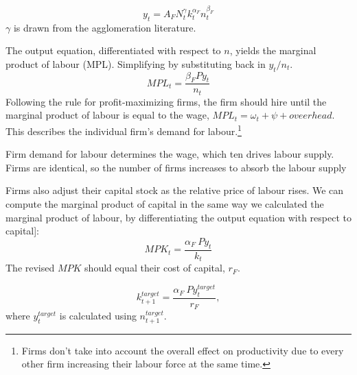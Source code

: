 \begin{equation}
    {y}_t= A_FN_t^\gamma k_t^{\alpha_F}n_t^{\beta_F} \label{eqn-urban-firm-output}
\end{equation}
$\gamma$ is drawn from the agglomeration literature.%

The output equation, differentiated with respect to  $n$, yields the marginal product of labour (MPL). Simplifying by substituting back in $y_t/n_t$. %
\begin{equation}MPL_{t} = \frac{\beta_{F}P{y}_{t}} {n_t} \label{eqn-urban-firm-mpl}
\end{equation} 
Following the rule for profit-maximizing firms, the firm should hire until the marginal product of labour is equal to the wage, $MPL_t= {\omega_t + \psi + oveerhead}$. This describes the individual firm's demand for labour.\footnote{Firms don't take into account the overall effect on productivity due to every other firm increasing their labour force at the same time. } 

Firm demand for labour determines the wage, which ten drives labour supply. 
Firms are identical, so the number of firms increases to absorb the labour supply



Firms also adjust their capital stock as the relative price of labour rises. We can compute the marginal product of capital in the same way we calculated the marginal product of labour, by differentiating the output equation with respect to capital]:
\begin{equation} MPK_t = \frac{\alpha_{F}\ P{y}_{t}}{k_{t}} \label{eqn-urban-firm-mpk}
\end{equation} 
The revised $MPK$ should equal their cost of capital, $r_F$. %

\begin{equation}k_{t+1}^{target}= \frac{\alpha_{F}\ P{y}^{target}_{t}}{r_F},\end{equation}
where  $y_t^{target}$  is calculated using $n^{target}_{t+1}$. %



